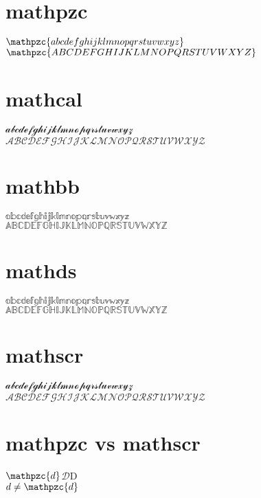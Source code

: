 \documentclass[a4paper,10pt]{article}
\begin{document}
	\section{mathpzc}

$\mathpzc{abcdefghijklmnopqrstuvwxyz}$
\\
$\mathpzc{ABCDEFGHIJKLMNOPQRSTUVWXYZ}$


	\section{mathcal}

$\mathcal{abcdefghijklmnopqrstuvwxyz}$
\\
$\mathcal{ABCDEFGHIJKLMNOPQRSTUVWXYZ}$


	\section{mathbb}

$\mathbb{abcdefghijklmnopqrstuvwxyz}$
\\
$\mathbb{ABCDEFGHIJKLMNOPQRSTUVWXYZ}$


	\section{mathds}

$\mathds{abcdefghijklmnopqrstuvwxyz}$
\\
$\mathds{ABCDEFGHIJKLMNOPQRSTUVWXYZ}$


	\section{mathscr}

$\mathscr{abcdefghijklmnopqrstuvwxyz}$
\\
$\mathscr{ABCDEFGHIJKLMNOPQRSTUVWXYZ}$


	\section{mathpzc vs mathscr}

$\mathpzc{d}$$\mathscr{D}$D
\\
$d \neq \mathpzc{d}$
\end{document}

